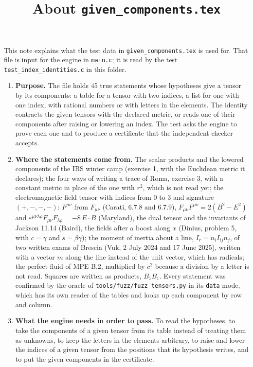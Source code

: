 \documentclass[11pt,a4paper]{article}
\title{About \texttt{given\_components.tex}}
\author{}
\date{}
\begin{document}
\maketitle
This note explains what the test data in \texttt{given\_components.tex} is used for. That file is input for the engine in \texttt{main.c}; it is read by the test \texttt{test\_index\_identities.c} in this folder.

\begin{enumerate}
\item \textbf{Purpose.} The file holds 45 true statements whose hypotheses give a tensor by its components: a table for a tensor with two indices, a list for one with one index, with rational numbers or with letters in the elements. The identity contracts the given tensors with the declared metric, or reads one of their components after raising or lowering an index. The test asks the engine to prove each one and to produce a certificate that the independent checker accepts.

\item \textbf{Where the statements come from.} The scalar products and the lowered components of the IBS winter camp (exercise 1, with the Euclidean metric it declares); the four ways of writing a trace of Roma, exercise 3, with a constant metric in place of the one with $r^{2}$, which is not read yet; the electromagnetic field tensor with indices from 0 to 3 and signature $(+,-,-,-)$: $F^{\mu\nu}$ from $F_{\mu\nu}$ (Carati, 6.7.8 and 6.7.9), $F_{\mu\nu} F^{\mu\nu} = 2(B^{2} - E^{2})$ and $\varepsilon^{\mu\nu\lambda\rho} F_{\mu\nu} F_{\lambda\rho} = -8\,E \cdot B$ (Maryland), the dual tensor and the invariants of Jackson 11.14 (Baird), the fields after a boost along $x$ (Dinius, problem 5, with $c = \gamma$ and $s = \beta\gamma$); the moment of inertia about a line, $I_{r} = n_{i} I_{ij} n_{j}$, of two written exams of Brescia (Vuk, 2 July 2024 and 17 June 2025), written with a vector $m$ along the line instead of the unit vector, which has radicals; the perfect fluid of MPE B.2, multiplied by $c^{2}$ because a division by a letter is not read. Squares are written as products, $B_{1} B_{1}$. Every statement was confirmed by the oracle of \texttt{tools/fuzz/fuzz\_tensors.py} in its \texttt{data} mode, which has its own reader of the tables and looks up each component by row and column.

\item \textbf{What the engine needs in order to pass.} To read the hypotheses, to take the components of a given tensor from its table instead of treating them as unknowns, to keep the letters in the elements arbitrary, to raise and lower the indices of a given tensor from the positions that its hypothesis writes, and to put the given components in the certificate.


\end{enumerate}
\end{document}
